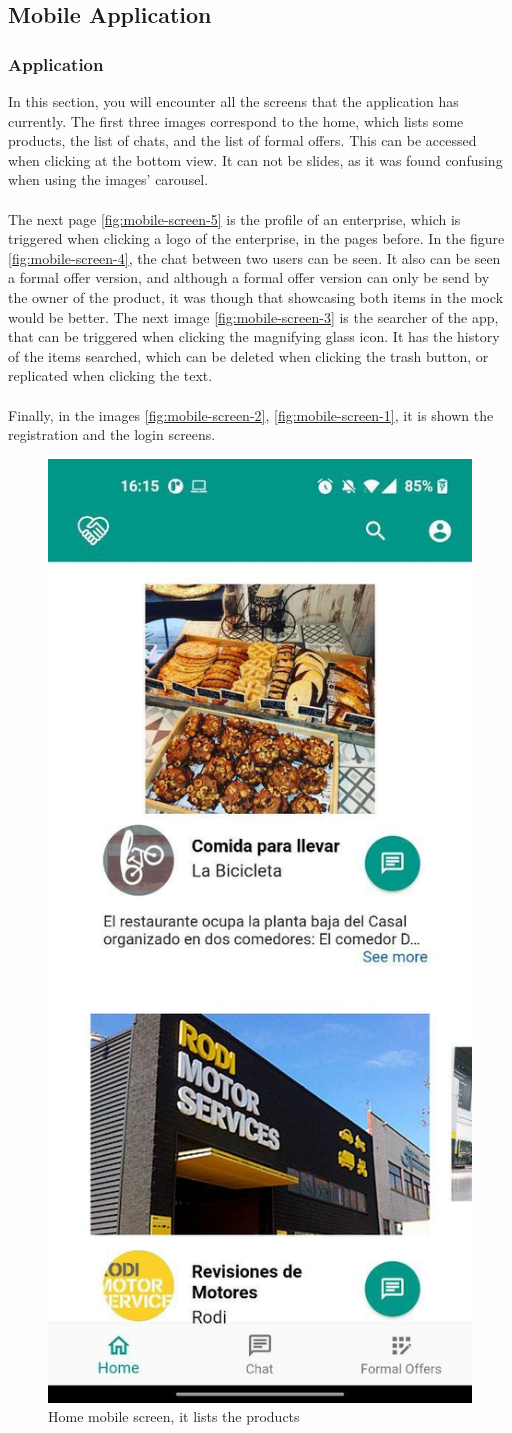 \documentclass[./main.tex]{subfiles}
\begin{document}
\subsection{Mobile Application}
\subsubsection{Application}
In this section, you will encounter all the screens that the application has currently. The first three images correspond to the home, which lists some products, the list of chats, and the list of formal offers. This can be accessed when clicking at the bottom view. It can not be slides, as it was found confusing when using the images' carousel.\\
\\
The next page \ref{fig:mobile-screen-5} is the profile of an enterprise, which is triggered when clicking a logo of the enterprise, in the pages before. In the figure \ref{fig:mobile-screen-4}, the chat between two users can be seen. It also can be seen a formal offer version, and although a formal offer version can only be send by the owner of the product, it was though that showcasing both items in the mock would be better. The next image \ref{fig:mobile-screen-3} is the searcher of the app, that can be triggered when clicking the magnifying  glass icon. It has the history of the items searched, which can be deleted when clicking the trash button, or replicated when clicking the text.\\
\\
Finally, in the images \ref{fig:mobile-screen-2}, \ref{fig:mobile-screen-1}, it is shown the registration and the login screens.
\begin{figure}[H]
	\centering
	\includegraphics[width=0.5\linewidth]{img/mobile-screen-8.jpg}
	\caption{Home mobile screen, it lists the products}
	\label{fig:mobile-screen-8}
\end{figure}
\end{document}
